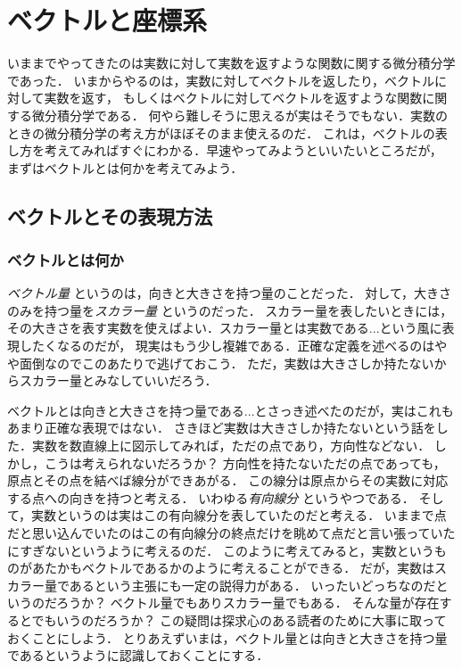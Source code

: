 \chapter{ベクトルと座標系}\label{vecterop}
いままでやってきたのは実数に対して実数を返すような関数に関する微分積分学であった．
いまからやるのは，実数に対してベクトルを返したり，ベクトルに対して実数を返す，
もしくはベクトルに対してベクトルを返すような関数に関する微分積分学である．
何やら難しそうに思えるが実はそうでもない．実数のときの微分積分学の考え方がほぼそのまま使えるのだ．
これは，ベクトルの表し方を考えてみればすぐにわかる．早速やってみようといいたいところだが，
まずはベクトルとは何かを考えてみよう．
\section{ベクトルとその表現方法}
\subsection{ベクトルとは何か}
\emph{ベクトル量}
というのは，向きと大きさを持つ量のことだった．
対して，大きさのみを持つ量を\emph{スカラー量}
というのだった．
スカラー量を表したいときには，その大きさを表す実数を使えばよい．スカラー量とは実数である...という風に表現したくなるのだが，
現実はもう少し複雑である．正確な定義を述べるのはやや面倒なのでこのあたりで逃げておこう．
ただ，実数は大きさしか持たないからスカラー量とみなしていいだろう．

ベクトルとは向きと大きさを持つ量である...とさっき述べたのだが，実はこれもあまり正確な表現ではない．
さきほど実数は大きさしか持たないという話をした．実数を数直線上に図示してみれば，ただの点であり，方向性などない．
しかし，こうは考えられないだろうか？ 方向性を持たないただの点であっても，原点とその点を結べば線分ができあがる．
この線分は原点からその実数に対応する点への向きを持つと考える．
いわゆる\emph{有向線分}
というやつである．
そして，実数というのは実はこの有向線分を表していたのだと考える．
いままで点だと思い込んでいたのはこの有向線分の終点だけを眺めて点だと言い張っていたにすぎないというように考えるのだ．
このように考えてみると，実数というものがあたかもベクトルであるかのように考えることができる．
だが，実数はスカラー量であるという主張にも一定の説得力がある．
いったいどっちなのだというのだろうか？ ベクトル量でもありスカラー量でもある．
そんな量が存在するとでもいうのだろうか？ この疑問は探求心のある読者のために大事に取っておくことにしよう．
とりあえずいまは，ベクトル量とは向きと大きさを持つ量であるというように認識しておくことにする．


